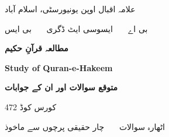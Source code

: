 \thispagestyle{empty}


\vspace*{0.9cm}
{\color{bmink}
  {\large علامہ اقبال اوپن یونیورسٹی، اسلام آباد}\par
  \vspace{3pt}
  {بی اے \ \textbullet\ \ ایسوسی ایٹ ڈگری \ \textbullet\ \ بی ایس}\par
  \vspace{20pt}
  {\Huge\bfseries\color{bmblue} مطالعہ قرآنِ حکیم}\par
  \vspace{6pt}
  {\large\bfseries \textenglish{Study of Quran-e-Hakeem}}\par
  \vspace{12pt}
  {\LARGE\bfseries متوقع سوالات اور ان کے جوابات}\par
  \vspace{12pt}
  {\large کورس کوڈ \textenglish{472}}\par
  \vspace{4pt}
  {اٹھارہ سوالات \ \textbullet\ \ چار حقیقی پرچوں سے ماخوذ\par}
}

\vspace{1.0cm}


